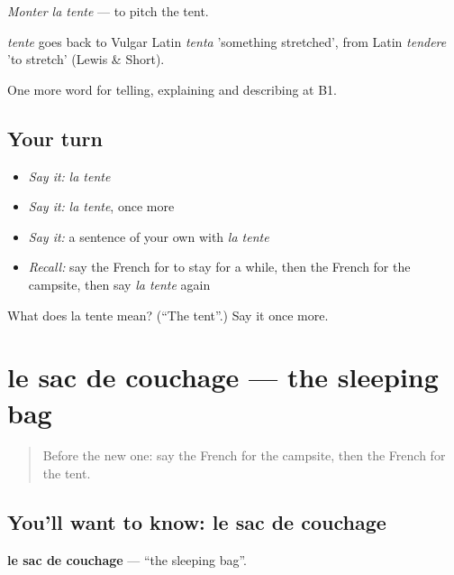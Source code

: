 \emph{Monter la tente} — to pitch the tent.

\begin{cousinweb}
\emph{tente} goes back to Vulgar Latin \emph{tenta} 'something stretched', from Latin \emph{tendere} 'to stretch' (Lewis \& Short).
\end{cousinweb}

\begin{grammarlens}[title={What you've built}]
One more word for telling, explaining and describing at B1.
\end{grammarlens}

\subsection*{Your turn}
\begin{itemize}
\raggedright
  \item \emph{Say it:} \emph{la tente}
  \item \emph{Say it:} \emph{la tente}, once more
  \item \emph{Say it:} a sentence of your own with \emph{la tente}
  \item \emph{Recall:} say the French for to stay for a while, then the French for the campsite, then say \emph{la tente} again
\end{itemize}

\begin{tcolorbox}[breakable,colback=teal!4,colframe=teal!35!black,title={Before you move on}]
What does la tente mean? (\textquotedblleft{}The tent\textquotedblright{}.) Say it once more.
\end{tcolorbox}
\section[le sac de couchage]{le sac de couchage — the sleeping bag}

\label{lesson:FR-C425-sac-de-couchage}



\begin{quote}
Before the new one: say the French for the campsite, then the French for the tent.
\end{quote}

\subsection*{You'll want to know: le sac de couchage}
\textbf{le sac de couchage} — \textquotedblleft{}the sleeping bag\textquotedblright{}.

